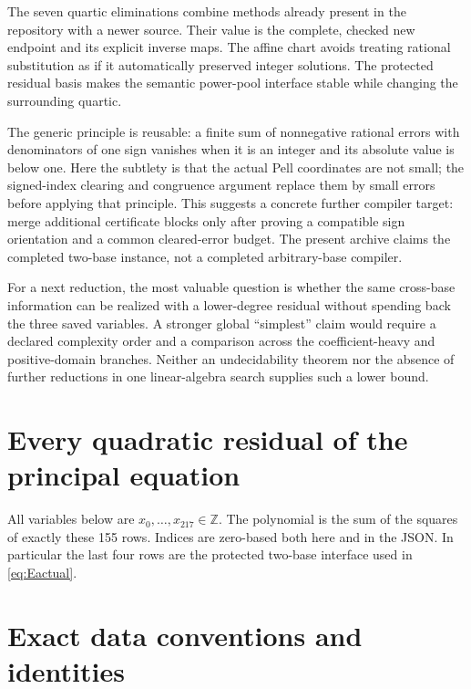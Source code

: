 \documentclass[11pt,letterpaper]{article}
\theoremstyle{definition}\newtheorem{definition}[theorem]{Definition}
\theoremstyle{remark}\newtheorem{remark}[theorem]{Remark}
\newcommand{\Z}{\mathbb Z}\newcommand{\N}{\mathbb N}
\begin{document}
The seven quartic eliminations combine methods already present in the
repository with a newer source. Their value is the complete, checked
new endpoint and its explicit inverse maps. The affine chart avoids
treating rational substitution as if it automatically preserved integer
solutions. The protected residual basis makes the semantic power-pool
interface stable while changing the surrounding quartic.

The generic principle is reusable: a finite sum of nonnegative rational
errors with denominators of one sign vanishes when it is an integer and
its absolute value is below one. Here the subtlety is that the actual
Pell coordinates are not small; the signed-index clearing and congruence
argument replace them by small errors before applying that principle.
This suggests a concrete further compiler target: merge additional
certificate blocks only after proving a compatible sign orientation and
a common cleared-error budget. The present archive claims the completed
two-base instance, not a completed arbitrary-base compiler.

For a next reduction, the most valuable question is whether the same
cross-base information can be realized with a lower-degree residual
without spending back the three saved variables. A stronger global
``simplest'' claim would require a declared complexity order and a
comparison across the coefficient-heavy and positive-domain branches.
Neither an undecidability theorem nor the absence of further reductions
in one linear-algebra search supplies such a lower bound.

\appendix
\section{Every quadratic residual of the principal equation}
\label{app:residuals}

All variables below are $x_0,\ldots,x_{217}\in\Z$. The polynomial is
the sum of the squares of exactly these 155 rows. Indices are zero-based
both here and in the JSON. In particular the last four rows are the
protected two-base interface used in \eqref{eq:Eactual}.

\begingroup\small
\setlength{\abovedisplayskip}{4pt}\setlength{\belowdisplayskip}{4pt}

\endgroup

\section{Exact data conventions and identities}
\end{document}
